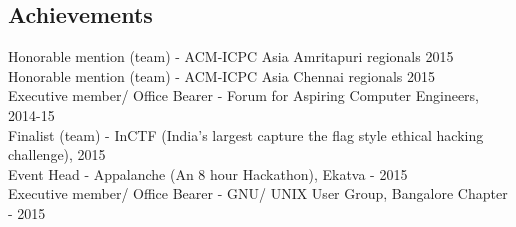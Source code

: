 \documentclass{res}
\begin{document}
\begin{resume}
 
\section{Achievements} 
\vspace{0.1in} 
	
    Honorable mention (team) - ACM-ICPC Asia Amritapuri regionals 2015 \\
		Honorable mention (team) - ACM-ICPC Asia Chennai regionals 2015 \\
		Executive member/ Office Bearer - Forum for Aspiring Computer Engineers, 2014-15 \\
    Finalist (team) - InCTF (India's largest capture the flag style ethical hacking challenge), 2015 \\
		Event Head - Appalanche (An 8 hour Hackathon), Ekatva - 2015 \\
		Executive member/ Office Bearer - GNU/ UNIX User Group, Bangalore Chapter - 2015
	

\end{resume}
\end{document}
